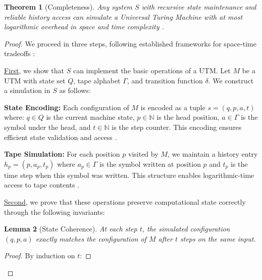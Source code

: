 \documentclass[12pt]{article}
\newtheorem{theorem}{Theorem}
\newtheorem{lemma}[theorem]{Lemma}
\begin{document}
\vspace{1em}

\begin{theorem}[Completeness]
Any system $S$ with recursive state maintenance and reliable history access can simulate a Universal Turing Machine with at most logarithmic overhead in space and time complexity \cite{boyle2024memory,liskiewicz1994complexity}.
\end{theorem}

\begin{proof}
We proceed in three steps, following established frameworks for space-time tradeoffs \cite{swamy1983space,hu2014computational}:

\vspace{0.5em}
\noindent\underline{First}, we show that $S$ can implement the basic operations of a UTM. Let $M$ be a UTM with state set $Q$, tape alphabet $\Gamma$, and transition function $\delta$. We construct a simulation in $S$ as follows:

\vspace{0.5em}
\noindent\textbf{State Encoding:} Each configuration of $M$ is encoded as a tuple $s = (q, p, a, t)$ where: $q \in Q$ is the current machine state, $p \in \mathbb{N}$ is the head position, $a \in \Gamma$ is the symbol under the head, and $t \in \mathbb{N}$ is the step counter.
This encoding ensures efficient state validation and access \cite{boyle2024memory,hu2014computational}.

\vspace{0.5em}
\noindent\textbf{Tape Simulation:} For each position $p$ visited by $M$, we maintain a history entry $h_p = (p, a_p, t_p)$ where $a_p \in \Gamma$ is the symbol written at position $p$ and $t_p$ is the time step when this symbol was written.
This structure enables logarithmic-time access to tape contents \cite{swamy1983space,liskiewicz1994complexity}.

\vspace{0.5em}
\noindent\underline{Second}, we prove that these operations preserve computational state correctly through the following invariants:

\begin{lemma}[State Coherence]
At each step $t$, the simulated configuration $(q, p, a)$ exactly matches the configuration of $M$ after $t$ steps on the same input.
\end{lemma}

\begin{proof}
By induction on $t$:


\end{proof}
\end{proof}
\end{document}
